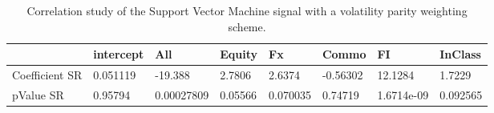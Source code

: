 \begin{table}[H]
\centering
\begin{tabular}{llllllll}
& intercept & All & Equity & Fx & Commo & FI & InClass \\ 
\hline 
Coefficient SR & 0.051119 & -19.388 & 2.7806 & 2.6374 & -0.56302 & 12.1284 & 1.7229 \\ 
pValue SR & 0.95794 & 0.00027809 & 0.05566 & 0.070035 & 0.74719 & 1.6714e-09 & 0.092565 \\ 
\hline
\end{tabular}
\caption{Correlation study of the Support Vector Machine signal with a volatility parity weighting scheme.}
\label{SVM_VP_CORR}
\end{table}